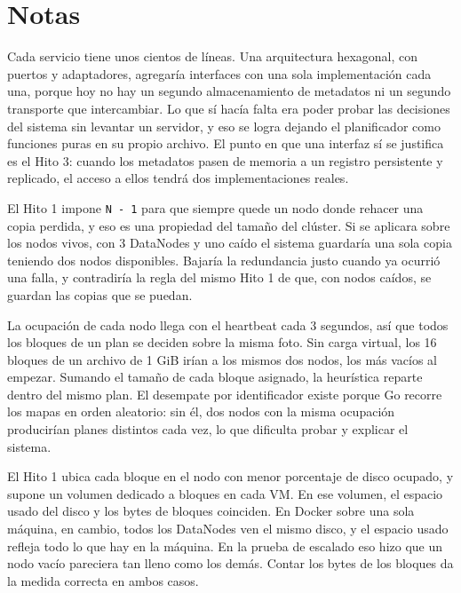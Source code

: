 \documentclass[10pt]{article}
\begin{document}
\separador

\section{Notas}

 Cada servicio tiene unos cientos de líneas. Una arquitectura hexagonal, con puertos y adaptadores, agregaría interfaces con una sola implementación cada una, porque hoy no hay un segundo almacenamiento de metadatos ni un segundo transporte que intercambiar. Lo que sí hacía falta era poder probar las decisiones del sistema sin levantar un servidor, y eso se logra dejando el planificador como funciones puras en su propio archivo. El punto en que una interfaz sí se justifica es el Hito 3: cuando los metadatos pasen de memoria a un registro persistente y replicado, el acceso a ellos tendrá dos implementaciones reales.

 El Hito 1 impone \texttt{N - 1} para que siempre quede un nodo donde rehacer una copia perdida, y eso es una propiedad del tamaño del clúster. Si se aplicara sobre los nodos vivos, con 3 DataNodes y uno caído el sistema guardaría una sola copia teniendo dos nodos disponibles. Bajaría la redundancia justo cuando ya ocurrió una falla, y contradiría la regla del mismo Hito 1 de que, con nodos caídos, se guardan las copias que se puedan.

 La ocupación de cada nodo llega con el heartbeat cada 3 segundos, así que todos los bloques de un plan se deciden sobre la misma foto. Sin carga virtual, los 16 bloques de un archivo de 1 GiB irían a los mismos dos nodos, los más vacíos al empezar. Sumando el tamaño de cada bloque asignado, la heurística reparte dentro del mismo plan. El desempate por identificador existe porque Go recorre los mapas en orden aleatorio: sin él, dos nodos con la misma ocupación producirían planes distintos cada vez, lo que dificulta probar y explicar el sistema.

 El Hito 1 ubica cada bloque en el nodo con menor porcentaje de disco ocupado, y supone un volumen dedicado a bloques en cada VM. En ese volumen, el espacio usado del disco y los bytes de bloques coinciden. En Docker sobre una sola máquina, en cambio, todos los DataNodes ven el mismo disco, y el espacio usado refleja todo lo que hay en la máquina. En la prueba de escalado eso hizo que un nodo vacío pareciera tan lleno como los demás. Contar los bytes de los bloques da la medida correcta en ambos casos.
\end{document}
